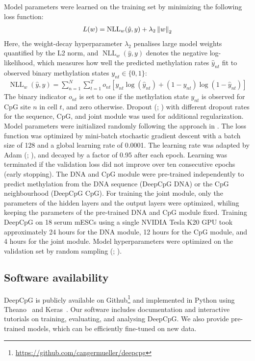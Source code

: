 Model parameters were learned on the training set by minimizing the following loss function:
\newcommand{\Xnll}{\operatorname{NLL}_w(\hat{y},y)}
\begin{align}
  L(w)=\Xnll+\lambda_2 \norm{w}_2
\end{align}
Here, the weight-decay hyperparameter $\lambda_2$ penalises large model weights quantified by the L2 norm, and $\Xnll$ denotes the negative log-likelihood, which measures how well the predicted methylation rates $\hat{y}_{nt}$ fit to observed binary methylation states $y_{nt}\in\{0,1\}$:
\begin{align}
  \Xnll=\sum_{n=1}^N \sum_{t=1}^T o_{nt}\left[y_{nt} \log(\hat{y}_{nt}) + (1-y_{nt}) \log(1-\hat{y}_{nt})\right]
\end{align}
The binary indicator $o_{nt}$ is set to one if the methylation state $y_{nt}$ is observed for CpG site $n$ in cell $t$, and zero otherwise. Dropout (\citep{srivastava_dropout:_2014}; ) with different dropout rates for the sequence, CpG, and joint module was used for additional regularization. Model parameters were initialized randomly following the approach in \citet{glorot_understanding_2010}. The loss function was optimized by mini-batch stochastic gradient descent with a batch size of 128 and a global learning rate of 0.0001. The learning rate was adapted by Adam (\citep{kingma_adam:_2014}; ), and decayed by a factor of 0.95 after each epoch. Learning was terminated if the validation loss did not improve over ten consecutive epochs (early stopping). The DNA and CpG module were pre-trained independently to predict methylation from the DNA sequence (DeepCpG DNA) or the CpG neighbourhood (DeepCpG CpG). For training the joint module, only the parameters of the hidden layers and the output layers were optimized, whiling keeping the parameters of the pre-trained DNA and CpG module fixed. Training DeepCpG on 18 serum mESCs using a single NVIDIA Tesla K20 GPU took approximately 24 hours for the DNA module, 12 hours for the CpG module, and 4 hours for the joint module. Model hyperparameters were optimized on the validation set by random sampling (\citep{bengio_practical_2012}; ).


\subsection{Software availability}

DeepCpG is publicly available on Github\footnote{\url{https://github.com/cangermueller/deepcpg}} and implemented in Python using Theano~\citep{bastien_theano:_2012} and Keras~\citep{chollet_keras:_????}. Our software includes documentation and interactive tutorials on training, evaluating, and analysing DeepCpG. We also provide pre-trained models, which can be efficiently fine-tuned on new data.


